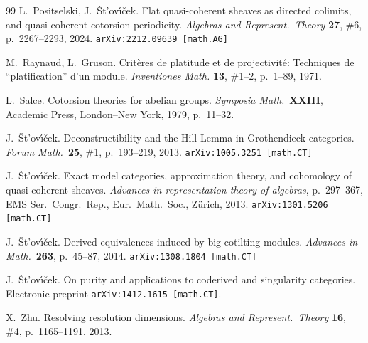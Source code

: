 \documentclass[12pt,a4paper]{amsart}
\newcommand{\+}{\nobreakdash-}
\renewcommand{\:}{\colon}
\theoremstyle{plain}
\theoremstyle{definition}
\begin{document}
\begin{thebibliography}{99}
 L.~Positselski, J.~\v St\!'ov\'\i\v cek.
   Flat quasi-coherent sheaves as directed colimits, and quasi-coherent
cotorsion periodicity.
\textit{Algebras and Represent.\ Theory} \textbf{27}, \#6,
p.~2267--2293, 2024.  \texttt{arXiv:2212.09639 [math.AG]}

 M.~Raynaud, L.~Gruson.
   Crit\`eres de platitude et de projectivit\'e: Techniques
de ``platification'' d'un module.
\textit{Inventiones Math.} \textbf{13}, \#1--2, p.~1--89, 1971.

 L.~Salce.
   Cotorsion theories for abelian groups.
\textit{Symposia Math.}\ \textbf{XXIII},
Academic Press, London--New York, 1979, p.~11--32.

 J.~\v St\!'ov\'\i\v cek.
   Deconstructibility and the Hill Lemma in Grothendieck categories.
\textit{Forum Math.}\ \textbf{25}, \#1, p.~193--219, 2013.
\texttt{arXiv:1005.3251 [math.CT]}

 J.~\v St\!'ov\'\i\v cek.
   Exact model categories, approximation theory, and cohomology of
quasi-coherent sheaves.
\textit{Advances in representation theory of algebras}, p.~297--367,
EMS Ser.\ Congr.\ Rep., Eur.\ Math.\ Soc., Z\" urich, 2013.
\texttt{arXiv:1301.5206 [math.CT]}

 J.~\v St\!'ov\'\i\v cek.
   Derived equivalences induced by big cotilting modules. 
\textit{Advances in Math.}\ \textbf{263}, p.~45--87, 2014.
\texttt{arXiv:1308.1804 [math.CT]}

 J.~\v St\!'ov\'\i\v cek.
   On purity and applications to coderived and singularity categories.
Electronic preprint \texttt{arXiv:1412.1615 [math.CT]}.

 X.~Zhu.
   Resolving resolution dimensions.
\textit{Algebras and Represent.\ Theory} \textbf{16}, \#4,
p.~1165--1191, 2013.

\end{thebibliography}
\end{document}
